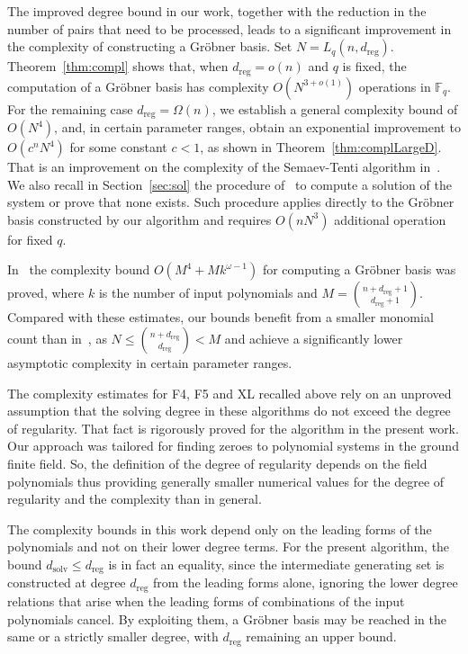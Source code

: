 \documentclass[a4paper, 12pt, oneside, openright]{article}
\begin{document}
The improved degree bound in our work, together with the reduction in the number of pairs that need to be processed, leads to a significant improvement in the complexity of constructing a Gr\"obner basis.
Set $N=L_q(n,d_{\mathrm{reg}}).$ Theorem~\ref{thm:compl}  shows that, when $d_{\mathrm{reg}}=o(n)$  and $q$ is fixed, the computation of a Gr\"obner basis has complexity $O(N^{3+o(1)})$ operations in $\mathbb{F}_q$.
For the remaining case $d_{\mathrm{reg}}=\Omega(n)$, we establish a general complexity bound of $O(N^4)$, and, in certain parameter ranges, obtain an exponential improvement to $O(c^n N^4)$ for some constant $c<1$, as shown in Theorem~\ref{thm:complLargeD}. That is an improvement on the complexity of the Semaev-Tenti algorithm in~\cite{ST}.
We also recall in Section~\ref{sec:sol} the procedure of~\cite{ST} to compute a solution of the system or prove that none exists. Such procedure applies directly to the Gr\"obner basis constructed by our algorithm and requires $O(nN^3)$ additional operation for fixed $q.$

 
In~\cite{S25} the complexity bound  $O(M^4+Mk^{\omega-1})$ for computing  a Gr\"obner basis was proved, where $k$ is the number of input polynomials and $M=\binom{n+d_{\mathrm{reg}}+1}{d_{\mathrm{reg}}+1}$.
Compared with these estimates, our bounds benefit from a smaller monomial count than in~\cite{S25}, as $N\le\binom{n+d_{\mathrm{reg}}}{d_{\mathrm{reg}}}<M$  and   achieve a significantly  lower asymptotic complexity in certain parameter ranges.

 

The complexity estimates for F4, F5 and XL recalled above rely on an unproved assumption that the solving degree in these algorithms do not exceed the degree of regularity. That fact is rigorously proved for the algorithm in the present work.  Our approach was tailored for finding zeroes to polynomial systems in the ground finite field. So, the definition of the degree of regularity depends on the field polynomials thus providing generally smaller numerical values for the degree of regularity and the complexity than in general.



The complexity bounds in this work depend only on the leading forms of the polynomials and not on their lower degree terms. For the present algorithm, the bound $d_{\mathrm{solv}}\le d_{\mathrm{reg}}$ is in fact an equality, since the intermediate generating set is constructed at degree $d_{\mathrm{reg}}$ from the leading forms alone, ignoring the lower degree relations that arise when the leading forms of combinations of the input polynomials cancel. By exploiting them,  a Gr\"obner basis may be reached in the same or a strictly smaller degree, with $d_{\mathrm{reg}}$ remaining an upper bound.
\end{document}
